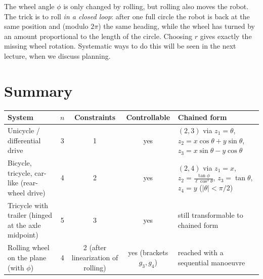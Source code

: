 \documentclass[11pt,a4paper]{article}
\def\bm#1{#1}%
\theoremstyle{definition}
\theoremstyle{plain}
\theoremstyle{remark}
\begin{document}
\begin{intuition}
The wheel angle $\phi$ is only changed by rolling, but rolling also moves the robot. The trick is to roll \emph{in a closed loop}: after one full circle the robot is back at the same position and (modulo $2\pi$) the same heading, while the wheel has turned by an amount proportional to the length of the circle. Choosing $r$ gives exactly the missing wheel rotation. Systematic ways to do this will be seen in the next lecture, when we discuss planning.
\end{intuition}


\section{Summary}

\begin{center}
\small
\renewcommand{\arraystretch}{1.25}
\begin{tabular}{p{2.9cm}cccp{4.6cm}}
\toprule
\textbf{System} & $n$ & \textbf{Constraints} & \textbf{Controllable} & \textbf{Chained form}\\
\midrule
Unicycle / differential drive & 3 & 1 & yes & $(2,3)$ via $z_1=\theta$, $z_2=x\cos\theta+y\sin\theta$, $z_3=x\sin\theta-y\cos\theta$\\
Bicycle, tricycle, car-like (rear-wheel drive) & 4 & 2 & yes & $(2,4)$ via $z_1=x$, $z_2=\frac{\tan\phi}{\ell\cos^3\theta}$, $z_3=\tan\theta$, $z_4=y$ ($|\theta|<\pi/2$)\\
Tricycle with trailer (hinged at the axle midpoint) & 5 & 3 & yes & still transformable to chained form\\
Rolling wheel on the plane (with $\phi$) & 4 & 2 (after linearization of rolling) & yes (brackets $\bm g_3,\bm g_4$) & reached with a sequential manoeuvre\\
\bottomrule
\end{tabular}
\end{center}
\end{document}
